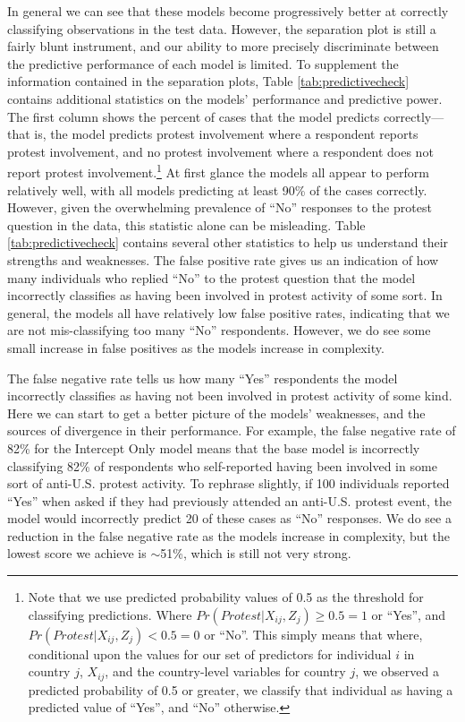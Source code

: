 In general we can see that these models become progressively better at correctly classifying observations in the test data. However, the separation plot is still a fairly blunt instrument, and our ability to more precisely discriminate between the predictive performance of each model is limited. To supplement the information contained in the separation plots, Table \ref{tab:predictivecheck} contains additional statistics on the models' performance and predictive power. The first column shows the percent of cases that the model predicts correctly---that is, the model predicts protest involvement where a respondent reports protest involvement, and no protest involvement where a respondent does not report protest involvement.\footnote{Note that we use predicted probability values of 0.5 as the threshold for classifying predictions. Where $Pr(Protest | X_{ij}, Z_j) \geq 0.5 = 1$ or ``Yes'', and $Pr(Protest | X_{ij}, Z_j) < 0.5 = 0$ or ``No''. This simply means that where, conditional upon the values for our set of predictors for individual $i$ in country $j$, $X_{ij}$, and the country-level variables for country $j$, we observed a predicted probability of 0.5 or greater, we classify that individual as having a predicted value of ``Yes'', and ``No'' otherwise.} At first glance the models all appear to perform relatively well, with all models predicting at least 90\% of the cases correctly. However, given the overwhelming prevalence of ``No'' responses to the protest question in the data, this statistic alone can be misleading. Table \ref{tab:predictivecheck} contains several other statistics to help us understand their strengths and weaknesses. The false positive rate gives us an indication of how many individuals who replied ``No'' to the protest question that the model incorrectly classifies as having been involved in protest activity of some sort. In general, the models all have relatively low false positive rates, indicating that we are not mis-classifying too many ``No'' respondents. However, we do see some small increase in false positives as the models increase in complexity.

The false negative rate tells us how many ``Yes'' respondents the model incorrectly classifies as having not been involved in protest activity of some kind. Here we can start to get a better picture of the models' weaknesses, and the sources of divergence in their performance. For example, the false negative rate of 82\% for the Intercept Only model means that the base model is incorrectly classifying 82\% of respondents who self-reported having been involved in some sort of anti-U.S. protest activity. To rephrase slightly, if 100 individuals reported ``Yes'' when asked if they had previously attended an anti-U.S. protest event, the model would incorrectly predict 20 of these cases as ``No'' responses. We do see a reduction in the false negative rate as the models increase in complexity, but the lowest score we achieve is $\sim$51\%, which is still not very strong.

